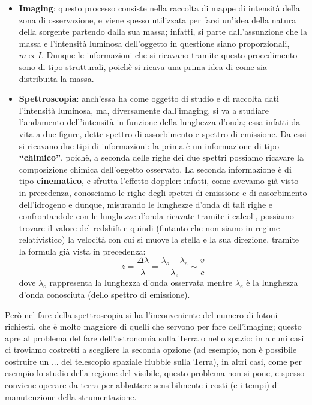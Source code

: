\begin{itemize}
	\item \textbf{Imaging}: questo processo consiste nella raccolta di mappe di intensità della zona di osservazione, e viene spesso utilizzata per farsi un'idea della natura della sorgente partendo dalla sua massa; infatti, si parte dall'assunzione che la massa e l'intensità luminosa dell'oggetto in questione siano proporzionali, $m \propto I$. Dunque le informazioni che si ricavano tramite questo procedimento sono di tipo strutturali, poichè si ricava una prima idea di come sia distribuita la massa.
	\item \textbf{Spettroscopia}: anch'essa ha come oggetto di studio e di raccolta dati l'intensità luminosa, ma, diversamente dall'imaging, si va a studiare l'andamento dell'intensità in funzione della lunghezza d'onda; essa infatti da vita a due  figure, dette spettro di assorbimento e spettro di emissione. Da essi si ricavano due tipi di informazioni: la prima è un informazione di tipo \textbf{``chimico''}, poichè, a seconda delle righe dei due spettri possiamo ricavare la composizione chimica dell'oggetto osservato. La seconda informazione è di tipo \textbf{cinematico}, e sfrutta l'effetto doppler: infatti, come avevamo già visto in precedenza, conosciamo le righe degli spettri di emissione e di assorbimento dell'idrogeno e dunque, misurando le lunghezze d'onda di tali righe e confrontandole con le lunghezze d'onda ricavate tramite i calcoli, possiamo trovare il valore del redshift e quindi (fintanto che non siamo in regime relativistico) la velocità con cui si muove la stella e la sua direzione, tramite la formula già vista in precedenza:
	$$z=\frac{\Delta \lambda}{\lambda}=\frac{\lambda_o - \lambda_e}{\lambda_e} \sim \frac{v}{c}$$
	dove $\lambda_o$ rappresenta la lunghezza d'onda osservata mentre $\lambda_e$ è la lunghezza d'onda conosciuta (dello spettro di emissione). 
\end{itemize}

Però nel fare della spettroscopia si ha l'inconveniente del numero di fotoni richiesti, che è molto maggiore di quelli che servono per fare dell'imaging; questo apre al problema del fare dell'astronomia sulla Terra o nello spazio: in alcuni casi ci troviamo costretti a scegliere la seconda opzione (ad esempio, non è possibile costruire un ... del telescopio spaziale Hubble sulla Terra), in altri casi, come per esempio lo studio della regione del visibile, questo problema non si pone, e spesso conviene operare da terra per abbattere sensibilmente i costi (e i tempi) di manutenzione della strumentazione.

